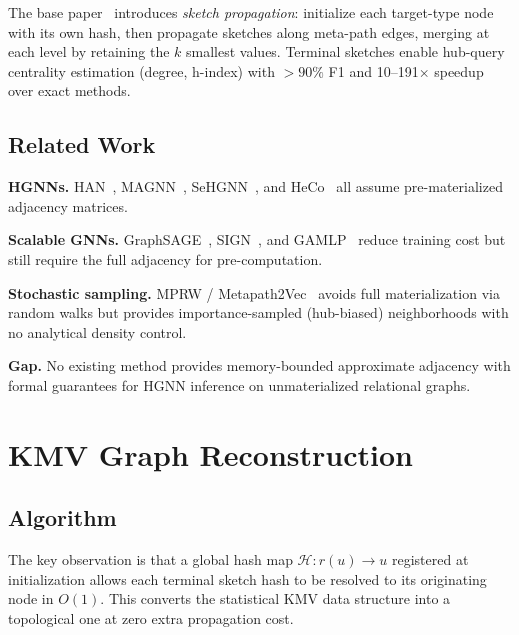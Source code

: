 \documentclass[sigconf]{acmart}
\begin{document}
The base paper~\cite{berahmand2024kmv} introduces \emph{sketch propagation}: initialize each target-type node with its own hash, then propagate sketches along meta-path edges, merging at each level by retaining the $k$ smallest values.
Terminal sketches enable hub-query centrality estimation (degree, h-index) with $>90\%$ F1 and 10--191$\times$ speedup over exact methods.

\subsection{Related Work}

\textbf{HGNNs.}
HAN~\cite{wang2019han}, MAGNN~\cite{fu2020magnn}, SeHGNN~\cite{yang2023sehgnn}, and HeCo~\cite{wang2021heco} all assume pre-materialized adjacency matrices.

\textbf{Scalable GNNs.}
GraphSAGE~\cite{hamilton2017sage}, SIGN~\cite{frasca2020sign}, and GAMLP~\cite{zhang2022gamlp} reduce training cost but still require the full adjacency for pre-computation.

\textbf{Stochastic sampling.}
MPRW / Metapath2Vec~\cite{dong2017metapath2vec} avoids full materialization via random walks but provides importance-sampled (hub-biased) neighborhoods with no analytical density control.

\textbf{Gap.}
No existing method provides memory-bounded approximate adjacency with formal guarantees for HGNN inference on unmaterialized relational graphs.

\section{KMV Graph Reconstruction}
\label{sec:reconstruction}

\subsection{Algorithm}

The key observation is that a global hash map $\mathcal{H}: r(u) \to u$ registered at initialization allows each terminal sketch hash to be resolved to its originating node in $O(1)$.
This converts the statistical KMV data structure into a topological one at zero extra propagation cost.
\end{document}
